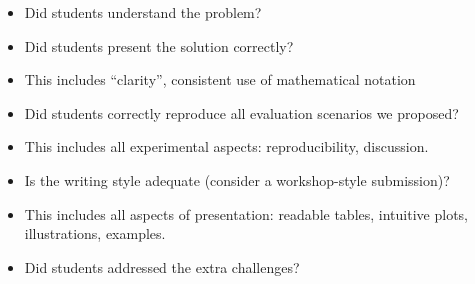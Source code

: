 \begin{itemize}
	\item Did students understand the problem?
	\item Did students present the solution correctly?
	\item This includes ``clarity'', consistent use of mathematical notation
\end{itemize}

\begin{itemize}
	\item Did students correctly reproduce all evaluation scenarios we proposed?
	\item This includes all experimental aspects: reproducibility, discussion.
\end{itemize}

\begin{itemize}
	\item Is the writing style adequate (consider a workshop-style submission)?
	\item This includes all aspects of presentation: readable tables, intuitive plots, illustrations, examples.
\end{itemize}

\begin{itemize}
	\item Did students addressed the extra challenges?
\end{itemize}

